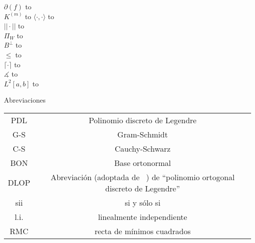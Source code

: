  $\partial(f)$ \hbox to\linewidth{\hfil Grado de un polinomio $f$ \hfil}   \\
 $K^{(m)}$ \hbox to  
 $\langle \cdot, \cdot \rangle$ \hbox to\linewidth{\hfil Producto punto \hfil}  \\
 $|| \cdot ||$ \hbox to\linewidth{\hfil Norma \hfil} \\
 $\Pi_{W}$ \hbox to\linewidth{\hfil Proyección sobre el subespacio cerrado $W$ \hfil}  \\
 $B^{\perp}$ \hbox to\linewidth{\hfil Complemento ortogonal de un subconjunto $B$ de un espacio con producto punto. \hfil}  \\
 $\leq$ \hbox to\linewidth{\hfil Relación ``ser subespacio de'' \hfil}   \\
 $\lceil \cdot \rceil$ \hbox to\linewidth{\hfil Función techo \hfil}  \\
 $\measuredangle$ \hbox to\linewidth{\hfil Ángulo \hfil}  \\
 $L^{2}[a,b]$ \hbox to \\



\vspace{0.5cm}

\begin{center}
\huge{Abreviaciones}
\end{center}

\vspace{0.5cm}

\begin{tabular}{ c c }
 PDL & Polinomio discreto de Legendre \\
 G-S & Gram-Schmidt \\
 C-S & Cauchy-Schwarz \\
 BON & Base ortonormal \\
 DLOP & Abreviación (adoptada de ~\cite{Neuman})
 de ``polinomio ortogonal discreto de Legendre'' \\
 sii & si y sólo si \\
 l.i. & linealmente independiente \\
 RMC & recta de mínimos cuadrados
\end{tabular}




\newpage